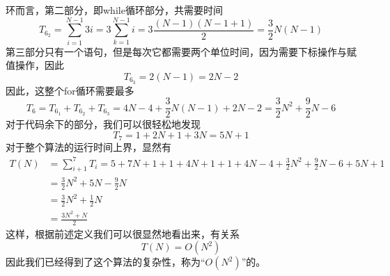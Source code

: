 \documentclass[a4paper,12pt]{ctexart}
\begin{document}
		环而言，第二部分，即while循环部分，共需要时间
		$$
		T_{6_2} = \sum_{i=1}^{N-1}3i=3\sum_{k=1}^{N-1}i=3\frac{(N-1)(N-1+1)}{2}=
		\frac{3}{2}N(N-1) 
		$$
		第三部分只有一个语句，但是每次它都需要两个单位时间，因为需要下标操作与赋值操作，因此
		$$
		T_{6_3}=2(N-1)=2N-2
		$$
		因此，这整个for循环需要最多
		$$
		T_6 = T_{6_1}+T_{6_2}+T_{6_3}=4N-4+\frac{3}{2}N(N-1)+2N-2=\frac{3}{2}N^2+
		\frac{9}{2}N-6
		$$
		对于代码余下的部分，我们可以很轻松地发现
		$$
		T_7=1+2N+1+3N=5N+1
		$$
		对于整个算法的运行时间上界，显然有
		\begin{align*}
				T(N)&=\sum_{i+1}^{7}T_i=5+7N+1+1+4N+1+1+4N-4+\frac{3}{2}N^2+\frac{9}
				{2}N-6+5N+1\\
				&=\frac{3}{2}N^2+5N-\frac{9}{2}N\\
				&=\frac{3}{2}N^2+\frac{1}{2}N\\
				&=\frac{3N^2+N}{2}
		\end{align*}
		这样，根据前述定义我们可以很显然地看出来，有关系
		$$
		T(N) = O(N^2)
		$$
		因此我们已经得到了这个算法的复杂性，称为“$O(N^2)$”的。
		
\end{document}

